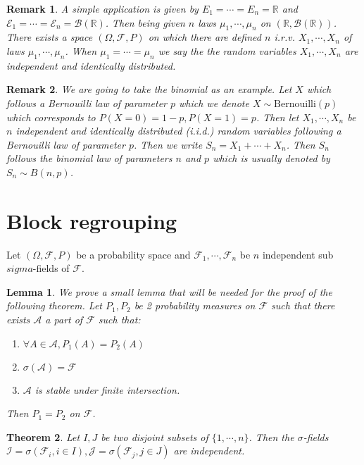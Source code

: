 \documentclass[10pt,a4paper]{book}
\newtheorem{theorem}{Theorem}[section]
\newtheorem{lemma}[theorem]{Lemma}
\newtheorem*{remark}{Remark}
\theoremstyle{definition}
\begin{document}
\begin{remark}
A simple application is given by $E_1 = \cdots = E_n = \mathbb{R}$ and $\mathcal{E}_1 = \cdots = \mathcal{E}_n = \mathcal{B}(\mathbb{R})$. Then being given $n$ laws $\mu_1, \cdots, \mu_n$ on $(\mathbb{R}, \mathcal{B}(\mathbb{R}))$. There exists a space $(\Omega, \mathcal{F}, P)$ on which there are defined $n$ i.r.v. $X_1, \cdots, X_n$ of laws $\mu_1, \cdots, \mu_n$. When $\mu_1 = \cdots = \mu_n$ we say the the random variables $X_1, \cdots, X_n$ are independent and identically distributed. 
\end{remark}

\begin{remark}
We are going to take the binomial as an example. Let $X$ which follows a Bernouilli law of parameter $p$ which we denote $X \sim \text{Bernouilli}(p)$ which corresponds to $P(X = 0) = 1- p, P(X = 1) = p$. Then let $X_1, \cdots, X_n$ be $n$ independent and identically distributed (i.i.d.) random variables following a Bernouilli law of parameter $p$. Then we write $S_n = X_1 + \cdots + X_n$. Then $S_n$ follows the binomial law of parameters $n$ and $p$ which is usually denoted by $S_n \sim B(n, p)$. 
\end{remark}

\section{Block regrouping}
Let $(\Omega, \mathcal{F}, P)$ be a probability space and $\mathcal{F}_1, \cdots, \mathcal{F}_n$ be $n$ independent sub $sigma$-fields of $\mathcal{F}$.

\begin{lemma} We prove a small lemma that will be needed for the proof of the following theorem. Let $P_1,P_2$ be 2 probability measures on $\mathcal{F}$ such that there exists $\mathcal{A}$ a part of $\mathcal{F}$ such that:
\begin{enumerate}
\item $\forall A \in \mathcal{A}, P_1(A) = P_2(A)$
\item $\sigma(\mathcal{A}) = \mathcal{F}$
\item $\mathcal{A}$ is stable under finite intersection.
\end{enumerate}
Then $P_1 = P_2$ on $\mathcal{F}$. 
\end{lemma}

\begin{theorem}
Let $I, J$ be two disjoint subsets of $\{1, \cdots, n\}$. Then the $\sigma$-fields $\mathcal{I} = \sigma(\mathcal{F}_i, i \in I), \mathcal{J} = \sigma(\mathcal{F}_j, j \in J)$ are independent.
\end{theorem}
\end{document}
